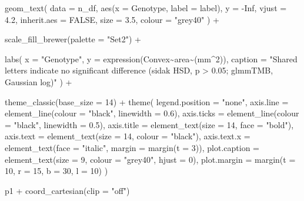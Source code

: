 \documentclass[
  letterpaper,
  DIV=11,
  numbers=noendperiod]{scrartcl}
\newenvironment{Shaded}{\begin{snugshade}}{\end{snugshade}}
\newcommand{\AttributeTok}[1]{\textcolor[rgb]{0.40,0.45,0.13}{#1}}
\newcommand{\ConstantTok}[1]{\textcolor[rgb]{0.56,0.35,0.01}{#1}}
\newcommand{\DecValTok}[1]{\textcolor[rgb]{0.68,0.00,0.00}{#1}}
\newcommand{\FloatTok}[1]{\textcolor[rgb]{0.68,0.00,0.00}{#1}}
\newcommand{\FunctionTok}[1]{\textcolor[rgb]{0.28,0.35,0.67}{#1}}
\newcommand{\NormalTok}[1]{\textcolor[rgb]{0.00,0.23,0.31}{#1}}
\newcommand{\SpecialCharTok}[1]{\textcolor[rgb]{0.37,0.37,0.37}{#1}}
\newcommand{\StringTok}[1]{\textcolor[rgb]{0.13,0.47,0.30}{#1}}
\newcounter{none} %
\begin{document}
\begin{Shaded}
\begin{Highlighting}[]
  \FunctionTok{geom\_text}\NormalTok{(}
    \AttributeTok{data =}\NormalTok{ n\_df, }\FunctionTok{aes}\NormalTok{(}\AttributeTok{x =}\NormalTok{ Genotype, }\AttributeTok{label =}\NormalTok{ label),}
    \AttributeTok{y =} \SpecialCharTok{{-}}\ConstantTok{Inf}\NormalTok{, }\AttributeTok{vjust =} \FloatTok{4.2}\NormalTok{, }\AttributeTok{inherit.aes =} \ConstantTok{FALSE}\NormalTok{,}
    \AttributeTok{size =} \FloatTok{3.5}\NormalTok{, }\AttributeTok{colour =} \StringTok{"grey40"}
\NormalTok{  ) }\SpecialCharTok{+}

  \FunctionTok{scale\_fill\_brewer}\NormalTok{(}\AttributeTok{palette =} \StringTok{"Set2"}\NormalTok{) }\SpecialCharTok{+}

  \FunctionTok{labs}\NormalTok{(}
    \AttributeTok{x       =} \StringTok{"Genotype"}\NormalTok{,}
    \AttributeTok{y       =} \FunctionTok{expression}\NormalTok{(Convex}\SpecialCharTok{\textasciitilde{}}\NormalTok{area}\SpecialCharTok{\textasciitilde{}}\NormalTok{(mm}\SpecialCharTok{\^{}}\DecValTok{2}\NormalTok{)),}
    \AttributeTok{caption =} \StringTok{"Shared letters indicate no significant difference (sidak HSD, p \textgreater{} 0.05; glmmTMB, Gaussian log)"}
\NormalTok{  ) }\SpecialCharTok{+}

  \FunctionTok{theme\_classic}\NormalTok{(}\AttributeTok{base\_size =} \DecValTok{14}\NormalTok{) }\SpecialCharTok{+}
  \FunctionTok{theme}\NormalTok{(}
    \AttributeTok{legend.position =} \StringTok{"none"}\NormalTok{,}
    \AttributeTok{axis.line       =} \FunctionTok{element\_line}\NormalTok{(}\AttributeTok{colour =} \StringTok{"black"}\NormalTok{, }\AttributeTok{linewidth =} \FloatTok{0.6}\NormalTok{),}
    \AttributeTok{axis.ticks      =} \FunctionTok{element\_line}\NormalTok{(}\AttributeTok{colour =} \StringTok{"black"}\NormalTok{, }\AttributeTok{linewidth =} \FloatTok{0.5}\NormalTok{),}
    \AttributeTok{axis.title      =} \FunctionTok{element\_text}\NormalTok{(}\AttributeTok{size =} \DecValTok{14}\NormalTok{, }\AttributeTok{face =} \StringTok{"bold"}\NormalTok{),}
    \AttributeTok{axis.text       =} \FunctionTok{element\_text}\NormalTok{(}\AttributeTok{size =} \DecValTok{14}\NormalTok{, }\AttributeTok{colour =} \StringTok{"black"}\NormalTok{),}
    \AttributeTok{axis.text.x     =} \FunctionTok{element\_text}\NormalTok{(}\AttributeTok{face =} \StringTok{"italic"}\NormalTok{, }\AttributeTok{margin =} \FunctionTok{margin}\NormalTok{(}\AttributeTok{t =} \DecValTok{3}\NormalTok{)),}
    \AttributeTok{plot.caption    =} \FunctionTok{element\_text}\NormalTok{(}\AttributeTok{size =} \DecValTok{9}\NormalTok{, }\AttributeTok{colour =} \StringTok{"grey40"}\NormalTok{, }\AttributeTok{hjust =} \DecValTok{0}\NormalTok{),}
    \AttributeTok{plot.margin     =} \FunctionTok{margin}\NormalTok{(}\AttributeTok{t =} \DecValTok{10}\NormalTok{, }\AttributeTok{r =} \DecValTok{15}\NormalTok{, }\AttributeTok{b =} \DecValTok{30}\NormalTok{, }\AttributeTok{l =} \DecValTok{10}\NormalTok{)}
\NormalTok{  )}

\NormalTok{p1 }\SpecialCharTok{+} \FunctionTok{coord\_cartesian}\NormalTok{(}\AttributeTok{clip =} \StringTok{"off"}\NormalTok{)}
\end{Highlighting}
\end{Shaded}
\end{document}
